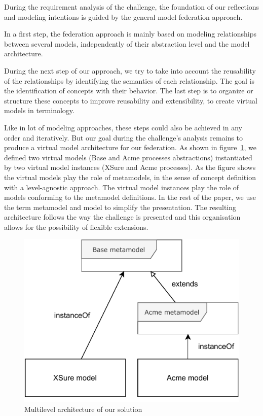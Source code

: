 
During the requirement analysis of the challenge, the foundation of our reflections and modeling intentions is guided by the general model federation approach. 

In a first step, the federation approach is mainly based on modeling relationships between several models, independently of their abstraction level and the model architecture.

During the next step of our approach, we try to take into account the reusability of the relationships by identifying the semantics of each relationship. The goal is the identification of concepts with their behavior. The last step is to organize or structure these concepts to improve reusability and extensibility, to create virtual models in \FML terminology.     

Like in lot of modeling approaches, these  steps could also be achieved in any order and iteratively. But our goal during the challenge's analysis remains to produce a \FML virtual model architecture for our federation. 
As shown in figure~\ref{fig:MultilevelArchitecture}, we defined two virtual models (Base and Acme processes abstractions) instantiated by two virtual model instances (XSure and Acme processes). As the figure shows the virtual models play the role of metamodels, in the sense of concept definition with a level-agnostic approach. The virtual model instances play the role of models conforming to the metamodel definitions. In the rest of the paper, we use the term metamodel and model to simplify the presentation.
The resulting architecture follows the way the challenge is presented and this
organisation allows for the possibility of flexible extensions.


\begin{figure}[t]
    \centering
    \includegraphics[width=0.7 \columnwidth]{Figures/MultilevelArchitecture.pdf}
    \caption{Multilevel architecture of our solution}
    \label{fig:MultilevelArchitecture}
\end{figure}

